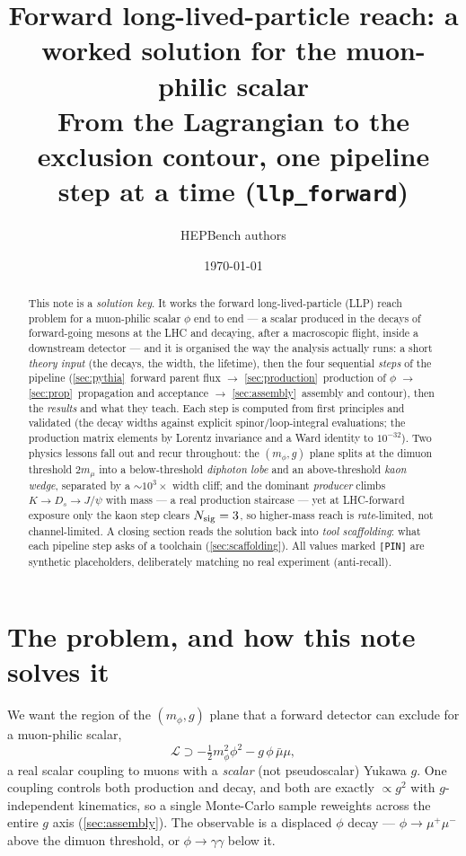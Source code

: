 \documentclass[11pt]{article}
\title{\textbf{Forward long-lived-particle reach: a worked solution for the
muon-philic scalar}\\[3pt]
\large From the Lagrangian to the exclusion contour, one pipeline step at a time
(\texttt{llp\_forward})}
\author{HEPBench authors}
\date{\today}
\newcommand{\mphi}{m_\phi}
\begin{document}
\maketitle

\begin{abstract}
\noindent This note is a \emph{solution key}. It works the forward long-lived-particle
(LLP) reach problem for a muon-philic scalar $\phi$ end to end --- a scalar
produced in the decays of forward-going mesons at the LHC and decaying, after a
macroscopic flight, inside a downstream detector --- and it is organised the way
the analysis actually runs: a short \emph{theory input} (the decays, the width,
the lifetime), then the four sequential \emph{steps} of the pipeline
(\cref{sec:pythia}~forward parent flux $\to$ \cref{sec:production}~production of
$\phi$ $\to$ \cref{sec:prop}~propagation and acceptance $\to$
\cref{sec:assembly}~assembly and contour), then the \emph{results} and what they
teach. Each step is computed from first principles and validated (the decay
widths against explicit spinor/loop-integral evaluations; the production matrix
elements by Lorentz invariance and a Ward identity to $10^{-32}$). Two physics
lessons fall out and recur throughout: the $(\mphi,g)$ plane splits at the dimuon
threshold $2m_\mu$ into a below-threshold \emph{diphoton lobe} and an
above-threshold \emph{kaon wedge}, separated by a $\sim\!10^3\times$ width cliff;
and the dominant \emph{producer} climbs $K\!\to\!D_s\!\to\!J/\psi$ with mass ---
a real production staircase --- yet at LHC-forward exposure only the kaon step
clears $N_{\rm sig}=3$, so higher-mass reach is \emph{rate}-limited, not
channel-limited. A closing section reads the solution back into
\emph{tool scaffolding}: what each pipeline step asks of a toolchain
(\cref{sec:scaffolding}). All values marked \texttt{[PIN]} are synthetic
placeholders, deliberately matching no real experiment (anti-recall).
\end{abstract}

\tableofcontents

\section{The problem, and how this note solves it}
\label{sec:problem}

We want the region of the $(\mphi,g)$ plane that a forward detector can exclude
for a muon-philic scalar,
\begin{equation}
\mathcal{L} \supset -\tfrac12 \mphi^2\phi^2 - g\,\phi\,\bar\mu\mu ,
\label{eq:lag}
\end{equation}
a real scalar coupling to muons with a \emph{scalar} (not pseudoscalar) Yukawa
$g$. One coupling controls both production and decay, and both are exactly
$\propto g^2$ with $g$-independent kinematics, so a single Monte-Carlo sample
reweights across the entire $g$ axis (\cref{sec:assembly}). The observable is a
displaced $\phi$ decay --- $\phi\to\mu^+\mu^-$ above the dimuon threshold, or
$\phi\to\gamma\gamma$ below it.
\end{document}
